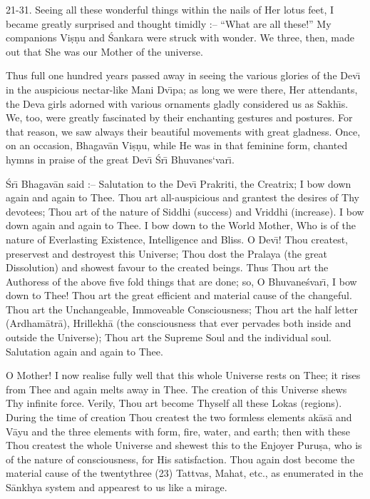 21-31. Seeing all these wonderful things within the nails of Her lotus feet, I became greatly surprised and thought timidly :-- ``What are all these!'' My companions Vi\d{s}\d{n}u and \'Sankara were struck with wonder. We three, then, made out that She was our Mother of the universe.

Thus full one hundred years passed away in seeing the various glories of the Dev\={\i} in the auspicious nectar-like Mani Dv\={\i}pa; as long we were there, Her attendants, the Deva girls adorned with various ornaments gladly considered us as Sakh\={\i}s. We, too, were greatly fascinated by their enchanting gestures and postures. For that reason, we saw always their beautiful movements with great gladness. Once, on an occasion, Bhagav\=an Vi\d{s}\d{n}u, while He was in that feminine form, chanted hymns in praise of the great Dev\={\i} \'Sr\={\i} Bhuvanes`var\={\i}.

\'Sr\={\i} Bhagav\=an said :-- Salutation to the Dev\={\i} Prakriti, the Creatrix; I bow down again and again to Thee. Thou art all-auspicious and grantest the desires of Thy devotees; Thou art of the nature of Siddhi (success) and Vriddhi (increase). I bow down again and again to Thee. I bow down to the World Mother, Who is of the nature of Everlasting Existence, Intelligence and Bliss. O Dev\={\i}! Thou createst, preservest and destroyest this Universe; Thou dost the Pralaya (the great Dissolution) and showest favour to the created beings. Thus Thou art the Authoress of the above five fold things that are done; so, O Bhuvane\'svar\={\i}, I bow down to Thee! Thou art the great efficient and material cause of the changeful. Thou art the Unchangeable, Immoveable Consciousness; Thou art the half letter (Ardham\=atr\=a), Hrillekh\=a (the consciousness that ever pervades both inside and outside the Universe); Thou art the Supreme Soul and the individual soul. Salutation again and again to Thee.

O Mother! I now realise fully well that this whole Universe rests on Thee; it rises from Thee and again melts away in Thee. The creation of this Universe shews Thy infinite force. Verily, Thou art become Thyself all these Lokas (regions). During the time of creation Thou createst the two formless elements ak\=as\=a and V\=ayu and the three elements with form, fire, water, and earth; then with these Thou createst the whole Universe and shewest this to the Enjoyer Puru\d{s}a, who is of the nature of consciousness, for His satisfaction. Thou again dost become the material cause of the twentythree (23) Tattvas, Mahat, etc., as enumerated in the S\=ankhya system and appearest to us like a mirage.

